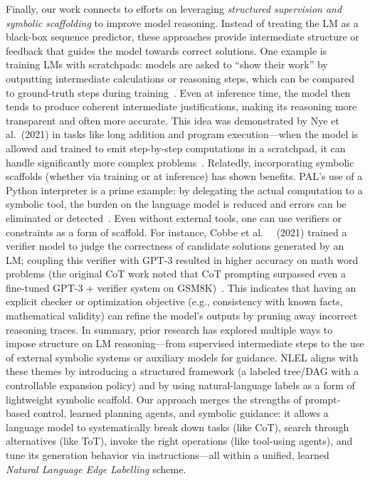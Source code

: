 \documentclass{article}
\theoremstyle{plain}
\theoremstyle{definition}
\theoremstyle{remark}
\begin{document}
Finally, our work connects to efforts on leveraging \emph{structured supervision and symbolic scaffolding} to improve model reasoning. Instead of treating the LM as a black-box sequence predictor, these approaches provide intermediate structure or feedback that guides the model towards correct solutions. One example is training LMs with scratchpads: models are asked to ``show their work'' by outputting intermediate calculations or reasoning steps, which can be compared to ground-truth steps during training~\cite{nye2021showyourwork}. Even at inference time, the model then tends to produce coherent intermediate justifications, making its reasoning more transparent and often more accurate. This idea was demonstrated by Nye et al.~(2021) in tasks like long addition and program execution—when the model is allowed and trained to emit step-by-step computations in a scratchpad, it can handle significantly more complex problems~\cite{nye2021showyourwork}. Relatedly, incorporating symbolic scaffolds (whether via training or at inference) has shown benefits. PAL’s use of a Python interpreter is a prime example: by delegating the actual computation to a symbolic tool, the burden on the language model is reduced and errors can be eliminated or detected~\cite{gao2023pal}. Even without external tools, one can use verifiers or constraints as a form of scaffold. For instance, Cobbe et al.~\cite{cobbe2021training} ~(2021) trained a verifier model to judge the correctness of candidate solutions generated by an LM; coupling this verifier with GPT-3 resulted in higher accuracy on math word problems (the original CoT work noted that CoT prompting surpassed even a fine-tuned GPT-3 + verifier system on GSM8K)~\cite{wei2022chain}. This indicates that having an explicit checker or optimization objective (e.g., consistency with known facts, mathematical validity) can refine the model’s outputs by pruning away incorrect reasoning traces. In summary, prior research has explored multiple ways to impose structure on LM reasoning—from supervised intermediate steps to the use of external symbolic systems or auxiliary models for guidance. NLEL aligns with these themes by introducing a structured framework (a labeled tree/DAG with a controllable expansion policy) and by using natural-language labels as a form of lightweight symbolic scaffold. Our approach merges the strengths of prompt-based control, learned planning agents, and symbolic guidance: it allows a language model to systematically break down tasks (like CoT), search through alternatives (like ToT), invoke the right operations (like tool-using agents), and tune its generation behavior via instructions—all within a unified, learned \emph{Natural Language Edge Labelling} scheme.
\end{document}
